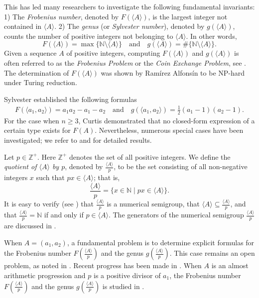 \documentclass[reqno, 12pt]{article}
\theoremstyle{mydefinition}
\theoremstyle{myremark}
\numberwithin{algorithm}{section}
\begin{document}
This has led many researchers to investigate the following fundamental invariants:
1) The \emph{Frobenius number}, denoted by $F(\langle A\rangle)$, is the largest integer not contained in $\langle A\rangle$.
2) The \emph{genus} (or \emph{Sylvester number}), denoted by $g(\langle A\rangle)$, counts the number of positive integers not belonging to $\langle A\rangle$. In other words, 
$$F(\langle A\rangle)=\max \{\mathbb{N}\setminus \langle A\rangle \}\quad \text{and}\quad 
g(\langle A\rangle) = \# \{\mathbb{N}\setminus \langle A\rangle \}.$$
Given a sequence $A$ of positive integers, computing $F(\langle A\rangle)$ and $g(\langle A\rangle)$ is often referred to as the \emph{Frobenius Problem} or the \emph{Coin Exchange Problem}, see \cite{Ramrez Alfonsn}.
The determination of $F(\langle A\rangle)$ was shown by Ram\'irez Alfons\'in \cite{RamrezAlfonsn-Combin} to be NP-hard under Turing reduction.

Sylvester \cite{J.J.Sylvester1} established the following formulas 
\begin{align*}
F(\langle a_1,a_2\rangle) = a_1a_2 - a_1 - a_2 \quad \text{and} \quad g(\langle a_1,a_2\rangle) = \frac{1}{2}(a_1-1)(a_2-1).
\end{align*}
For the case when $n \geq 3$, Curtis \cite{F.Curtis} demonstrated that no closed-form expression of a certain type exists for $F(A)$. Nevertheless, numerous special cases have been investigated; we refer to \cite[Section 2; Section 3]{Ramrez Alfonsn} and \cite{Liu-Xin} for detailed results.


Let $p\in \mathbb{Z}^{+}$. Here $\mathbb{Z}^{+}$ denotes the set of all positive integers.
We define the \emph{quotient of $\langle A\rangle$ by $p$}, denoted by $\frac{\langle A\rangle}{p}$, to be the set consisting of all non-negative integers $x$ such that $px \in \langle A\rangle$; that is,
$$\frac{\langle A\rangle}{p} = \{ x \in \mathbb{N} \mid px \in \langle A\rangle \}.$$
It is easy to verify (see \cite[Section 5]{J.C.Rosales}) that $\frac{\langle A\rangle}{p}$ is a numerical semigroup, that $\langle A\rangle \subseteq\frac{\langle A\rangle}{p}$, and that $\frac{\langle A\rangle}{p}=\mathbb{N}$ if and only if $p\in\langle A\rangle$. The generators of the numerical semigroup $\frac{\langle A\rangle}{p}$ are discussed in \cite{Liu-BAMS}.


When $A = (a_1, a_2)$, a fundamental problem is to determine explicit formulas for the Frobenius number $F\left(\frac{\langle A\rangle}{p}\right)$ and the genus $g\left(\frac{\langle A\rangle}{p}\right)$. 
This case remains an open problem, as noted in \cite{MDelgado13}. Recent progress has been made in \cite{E.Cabanillas,F.Strazzanti}.
When $A$ is an almost arithmetic progression and $p$ is a positive divisor of $a_1$, the Frobenius number $F\left(\frac{\langle A\rangle}{p}\right)$ and the genus $g\left(\frac{\langle A\rangle}{p}\right)$ is studied in \cite{A.Adeniran,Liu-IJAC}.
\end{document}

